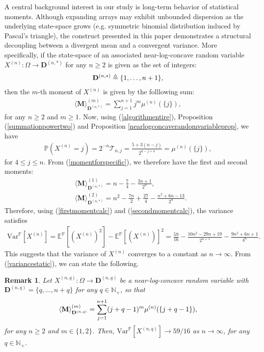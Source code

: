 \documentclass[a4paper,12pt]{article}
\newtheorem{rem}[thm]{Remark}
\def\P{\mathbb{P}}
\def\E{\mathbb{E}}
\def\N{\mathbb{N}}
\def\T{\mathcal{T}}
\begin{document}
A central background interest in our study is long-term behavior of statistical moments. Although expanding arrays may exhibit unbounded dispersion as the underlying state-space grows (e.g. symmetric binomial distribution induced by Pascal's triangle), the construct presented in this paper demonstrates a structural decoupling between a divergent mean and a convergent variance. More specifically, if the state-space of an associated near-log-concave random variable $X^{(n)} : \Omega \rightarrow \mathbf{D}^{(n,*)}$ for any $n\geq 2$ is given as the set of integers:
\begin{align}
\mathbf{D}^{(n,*)} \triangleq \{1,\ldots,n+1\}, \notag
\end{align}
then the $m$-th moment of $X^{(n)}$ is given by the folllowing sum:
\begin{align}
\langle\textbf{M}\rangle_{\mathbf{D}^{(n,*)}}^{(m)} = \sum_{j=1}^{n+1} j^m\mu^{(n)}(\{j\}), \label{momentforspecific}
\end{align}
for any $n\geq 2$ and $m\geq 1$. Now, using (\ref{algorithmentire}), Proposition (\ref{summationpowertwo}) and Proposition \ref{nearlogconcaverandomvariableprop}, we have
\begin{align}
\P(X^{(n)} = j) = 2^{-n}\T_{n,j} = \frac{5 + 3(n-j)}{2^{n-j+4}} = \mu^{(n)}(\{j\}), \label{reducedprobexp}
\end{align}
for $4\leq j \leq n$. From (\ref{momentforspecific}), we therefore have the first and second moments:
\begin{align}
&\langle\textbf{M}\rangle_{\mathbf{D}^{(n,*)}}^{(1)} = n - \frac{7}{4} - \frac{3n + 1}{2^n}, \label{firstmomentcalc} \\
&\langle\textbf{M}\rangle_{\mathbf{D}^{(n,*)}}^{(2)} = n^2 - \frac{7n}{2} + \frac{27}{4} - \frac{n^2 + 6n -13}{2^n}. \label{secondmomentcalc}
\end{align}
Therefore, using (\ref{firstmomentcalc}) and (\ref{secondmomentcalc}), the variance satisfies
\begin{align}
\text{Var}^{\P}\left[X^{(n)}\right] = \E^{\P}\left[(X^{(n)})^2\right] - \E^{\P}\left[(X^{(n)})\right]^2 = \frac{59}{16} - \frac{10n^2 - 29n + 19}{2^{n+1}} - \frac{9n^2 + 6n + 1}{4^n}. \label{variancestatic}
\end{align}
This suggests that the variance of $X^{(n)}$ converges to a constant as $n\rightarrow\infty$. From (\ref{variancestatic}), we can state the following.
\begin{rem}
Let $X^{(n,q)} : \Omega \rightarrow \mathbf{D}^{(n,q)}$ be a near-log-concave random variable with $\mathbf{D}^{(n,q)} = \{q,\ldots,n+q\}$ for any $q\in\N_+$, so that 
\begin{align}
\langle\textbf{M}\rangle_{\mathbf{D}^{(n,q)}}^{(m)} = \sum_{j=1}^{n+1} (j + q -1)^m\mu^{(n)}(\{j + q - 1\}), \notag
\end{align}
for any $n\geq 2$ and $m\in\{1,2\}$. Then, $\text{Var}^{\P}\left[X^{(n,q)}\right]  \rightarrow 59/16$ as $n \rightarrow \infty$, for any $q\in\N_+$.
\end{rem}
\end{document}
